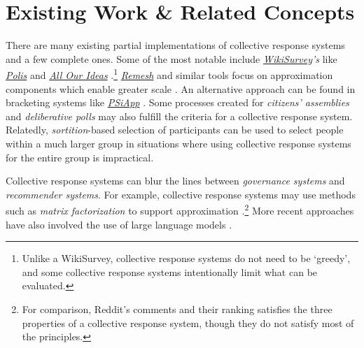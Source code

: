\documentclass[sigconf,authorversion,nonacm,linkcolor=blue,colorlinks]{acmart}
\begin{document}
\hypertarget{related-concepts}{%
\section{Existing Work \& Related Concepts}\label{related-concepts}}
There are many existing partial implementations of collective response systems and a few complete ones. Some of the most notable include \emph{\href{https://en.wikipedia.org/wiki/Wiki_survey}{WikiSurvey}'s} like \emph{\href{http://pol.is}{Polis}} and \emph{\href{https://www.allourideas.org/}{All Our Ideas}} \cite{smallPolis2021, salganikWikiSurveysOpen2015a}.\footnote{Unlike a WikiSurvey, collective response systems do not need to be `greedy', and some collective response systems intentionally limit what can be evaluated.} \emph{\href{https://www.remesh.ai/}{Remesh}} and similar tools focus on approximation components which enable greater scale \cite{2021ASRSGWilliamsConductsRemesh}. An alternative approach can be found in bracketing systems like \emph{\href{https://www.thepsiapp.com/}{PSiApp}} \cite{PSi}. Some processes created for \emph{citizens' assemblies} \cite{kimbrawhite2022FacilitatingDeliberationPractical} and \emph{deliberative polls} \cite{fishkin2019DemocracyWhenPeople} may also fulfill the criteria for a collective response system. Relatedly, \emph{sortition}-based selection of participants can be used to select people within a much larger group in situations where using collective response systems for the entire group is impractical.

Collective response systems can blur the lines between \emph{governance systems} and \emph{recommender systems}. For example, collective response systems may use methods such as \emph{matrix factorization} to support approximation \cite{bilichRemesh2019}.\footnote{For comparison, Reddit's comments and their ranking satisfies the three properties of a collective response system, though they do not satisfy most of the principles.} More recent approaches have also involved the use of large language models \cite{konya2022elicitation,bakker2022FinetuningLanguageModelsa}.
\end{document}
